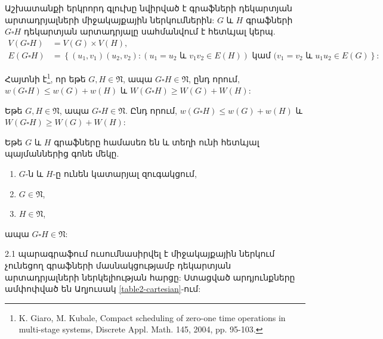 Աշխատանքի երկրորդ գլուխը նվիրված է գրաֆների դեկարտյան արտադրյալների միջակայքային ներկումներին: 
$G$ և $H$ գրաֆների $G\square H$ դեկարտյան արտադրյալը սահմանվում է հետևյալ կերպ.
\begin{align*}
V(G \square H) &= V(G) \times V(H),\\
E(G \square H) &= \left\{(u_1,v_1)(u_2,v_2) : (u_1=u_2 \text{ և } v_1v_2 \in E(H)) \text{ կամ } (v_1=v_2 \text{ և } u_1u_2 \in E(G) \right\}:
\end{align*} 

Հայտնի է\footnote{K. Giaro, M. Kubale, Compact scheduling of zero-one time operations in multi-stage systems, Discrete Appl. Math. 145, 2004, pp. 95-103.}, որ եթե $G,H\in \mathfrak{N}$, ապա $G\square H\in \mathfrak{N}$, ընդ որում,
$w(G\square H)\leq w(G)+w(H)$ և $W(G\square H)\geq W(G)+W(H)$:

\begin{hide}
\begin{theorem}\cite{GiaroKubale2004,Kubale2004}
\label{t2_cartesian} Եթե $G,H\in \mathfrak{N}$, ապա $G\square H\in \mathfrak{N}$. Ընդ որում,
$w(G\square H)\leq w(G)+w(H)$ և $W(G\square H)\geq W(G)+W(H)$:
\end{theorem}

\begin{theorem}\cite{Petrosyan2011}
\label{t2_kotzig} Եթե $G$ և $H$ գրաֆները համասեռ են և տեղի ունի հետևյալ պայմաններից գոնե մեկը.
\begin{enumerate}
\item $G$-ն և $H$-ը ունեն կատարյալ զուգակցում,
\item $G\in \mathfrak{N}$,
\item $H\in \mathfrak{N}$,
\end{enumerate}
ապա $G \square H \in \mathfrak{N}$:
\end{theorem}
\end{hide}
2.1 պարագրաֆում ուսումնասիրվել է միջակայքային ներկում չունեցող գրաֆների մասնակցությամբ դեկարտյան արտադրյալների ներկելիության հարցը: Ստացված արդյունքները ամփոփված են Աղյուսակ \ref{table2-cartesian}-ում:

